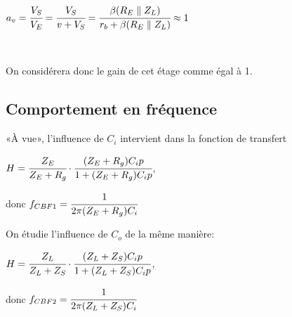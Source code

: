     $a_v = \cfrac{V_S}{V_E} = \cfrac{V_S}{v+V_S} = \cfrac{\beta(R_E \parallel Z_L)}{r_b+\beta(R_E\parallel Z_L)} \approx 1$

    ~

    On considérera donc le gain de cet étage comme égal à 1.

   \subsection{Comportement en fréquence}
    «À vue», l’influence de $C_i$ intervient dans la fonction de transfert
    
    $H = \cfrac{Z_E}{Z_E+R_g}\cdot\cfrac{(Z_E+R_g)C_ip}{1+(Z_E+R_g)C_ip}$, 

    donc $f_{CBF1} = \cfrac{1}{2\pi(Z_E+R_g)C_i}$

    On étudie l’influence de $C_o$ de la même manière:

    $H = \cfrac{Z_L}{Z_L+Z_S}\cdot\cfrac{(Z_L+Z_S)C_ip}{1+(Z_L+Z_S)C_ip}$, 

    donc $f_{CBF2} = \cfrac{1}{2\pi(Z_L+Z_S)C_i}$


